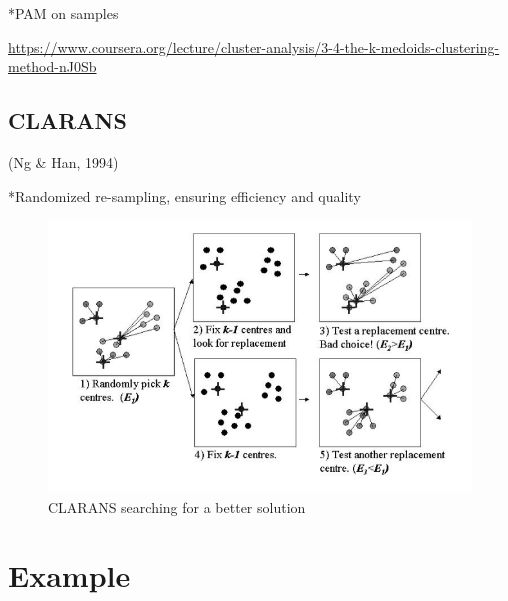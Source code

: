 \documentclass[12pt,twoside]{amherstthesis}
\begin{document}
  *PAM on samples
  
  \url{https://www.coursera.org/lecture/cluster-analysis/3-4-the-k-medoids-clustering-method-nJ0Sb}
  
  \section{CLARANS}\label{clarans}
  
  (Ng \& Han, 1994)
  
  *Randomized re-sampling, ensuring efficiency and quality
  
  \begin{Shaded}
  \begin{Highlighting}[]
  
  \NormalTok{(} \NormalTok{, }
         \NormalTok{, }
         \NormalTok{, } \NormalTok{, } \NormalTok{)}
  \end{Highlighting}
  \end{Shaded}
  
  \begin{figure}[htbp]
  \centering
  \includegraphics[scale = 0.5,angle = 0]{clustering_pic.png}
  \caption[CLARANS searching for a better solution]{\normalsize{CLARANS searching for a better solution}}
  \label{fig:CLARANS}
  \end{figure}
  
  \chapter{Example}\label{typeset-equ}
  
\end{document}
